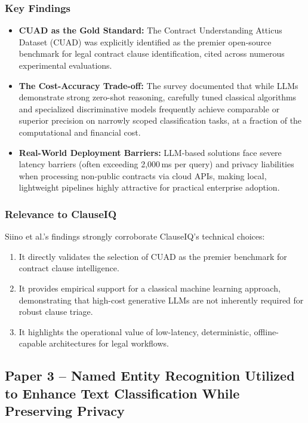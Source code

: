 \subsubsection*{Key Findings}
\begin{itemize}
    \item \textbf{CUAD as the Gold Standard:} The Contract Understanding Atticus Dataset (CUAD) was explicitly identified as the premier open-source benchmark for legal contract clause identification, cited across numerous experimental evaluations.
    \item \textbf{The Cost-Accuracy Trade-off:} The survey documented that while LLMs demonstrate strong zero-shot reasoning, carefully tuned classical algorithms and specialized discriminative models frequently achieve comparable or superior precision on narrowly scoped classification tasks, at a fraction of the computational and financial cost.
    \item \textbf{Real-World Deployment Barriers:} LLM-based solutions face severe latency barriers (often exceeding 2,000\,ms per query) and privacy liabilities when processing non-public contracts via cloud APIs, making local, lightweight pipelines highly attractive for practical enterprise adoption.
\end{itemize}

\subsubsection*{Relevance to ClauseIQ}
Siino et al.'s findings strongly corroborate ClauseIQ's technical choices:
\begin{enumerate}
    \item It directly validates the selection of CUAD as the premier benchmark for contract clause intelligence.
    \item It provides empirical support for a classical machine learning approach, demonstrating that high-cost generative LLMs are not inherently required for robust clause triage.
    \item It highlights the operational value of low-latency, deterministic, offline-capable architectures for legal workflows.
\end{enumerate}

\subsection*{Paper 3 -- Named Entity Recognition Utilized to Enhance Text Classification While Preserving Privacy}
\label{subsec:paper3}

